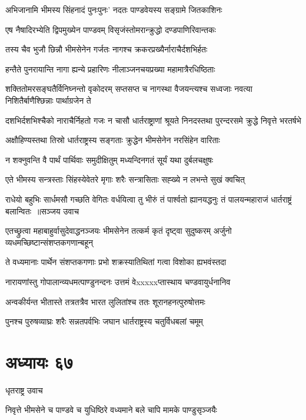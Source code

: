 \twolineshloka
{अभिजानामि भीमस्य सिंहनादं पुनःपुनः'}
{नदतः पाण्डवेयस्य सङ्ग्रामे जितकाशिनः}


\twolineshloka
{एष नैषादिरभ्येति द्विपमुख्येन पाण्डवम्}
{विसृजंस्तोमरान्क्रुद्धो दण्डपाणिरिवान्तकः}


\twolineshloka
{तस्य चैव भुजौ छिन्नौ भीमसेनेन गर्जतः}
{नागश्च क्रकरप्रख्यैर्नाराचैर्दशभिर्हतः}


\twolineshloka
{हन्तैते पुनरायान्ति नागा ह्यन्ये प्रहारिणः}
{नीलाञ्जनचयप्रख्या महामात्रैरधिष्ठिताः}


\threelineshloka
{शक्तितोमरसङ्घतैर्विनिघ्नन्तो वृकोदरम्}
{सप्तसप्त च नागस्था वैजयन्त्यश्च सध्वजाः}
{नवत्या निशितैर्बाणैश्छिन्नाः पार्थाग्रजेन ते}


दशभिर्दशभिश्चैको नाराचैर्निहतो गजः
\twolineshloka
{न चासौ धार्तराष्ट्राणां श्रूयते निनदस्तथा}
{पुरन्दरसमे क्रुद्धे निवृत्ते भरतर्षभे}


\twolineshloka
{अक्षौहिण्यस्तथा तिस्रो धार्तराष्ट्रस्य सङ्गताः}
{क्रुद्धेन भीमसेनेन नरसिंहेन वारिताः}


\twolineshloka
{न शक्नुवन्ति वै पार्थं पार्थिवाः समुदीक्षितुम्}
{मध्यन्दिनगतं सूर्यं यथा दुर्बलचक्षुषः}


\twolineshloka
{एते भीमस्य सन्त्रस्ताः सिंहस्येवेतरे मृगाः}
{शरैः सन्त्रासिताः सह्ख्ये न लभन्ते सुखं क्वचित्}


\fourlineindentedshloka
{राधेयो बहुभिः सार्धमसौ गच्छति वेगितः}
{वर्धयित्वा तु भीरुं तं पार्श्वतो ह्यानयद्धनुः}
{तं पालयन्महाराजं धार्तराष्ट्रं बलान्वितः ॥सञ्जय उवाच}
{}


\threelineshloka
{एतच्छ्रुत्वा महाबाहुर्वासुदेवाद्धनञ्जयः}
{भीमसेनेन तत्कर्म कृतं दृष्ट्वा सुदुष्करम्}
{अर्जुनो व्यधमच्छिष्टान्संशप्तकगणान्बहून्}


\twolineshloka
{ते वध्यमानाः पार्थेन संशप्तकगणाः प्रभो}
{शक्रस्यातिथितां गत्वा विशोका ह्यभवंस्तदा}


\twolineshloka
{नारायणांस्तु गोपालान्व्यधमत्पाण्डुनन्दनः}
{उत्तमं वेxxxxxप्तास्थाय चण्डवायुर्धनानिव}


\twolineshloka
{अन्वकीर्यन्त भीतास्ते तत्रतत्रैव भारत}
{लुलितांश्च ततः शूरानहनत्पुरुषोत्तमः}


\twolineshloka
{पुनश्च पुरुषव्याघ्रः शरैः सन्नतपर्वभिः}
{जघान धार्तराष्ट्रस्य चतुर्विधबलां चमूम्}


\chapter{अध्यायः ६७}
\twolineshloka
{धृतराष्ट्र उवाच}
{}


\twolineshloka
{निवृत्ते भीमसेने च पाण्डवे च युधिष्ठिरे}
{वध्यमाने बले चापि मामके पाण्डुसृञ्जयैः}


